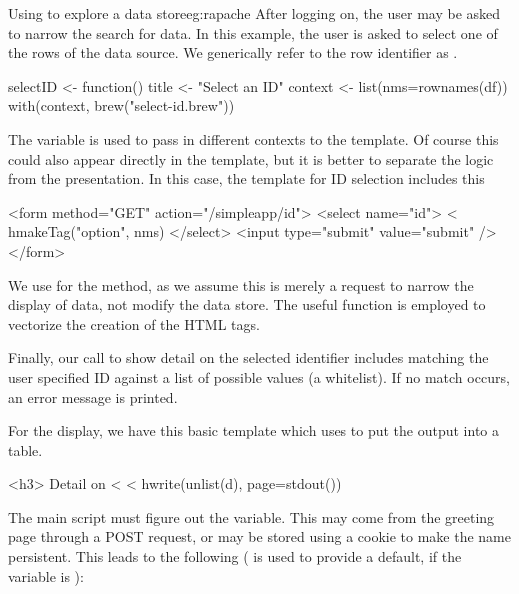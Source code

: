 \begin{example}{Using  to explore a data store}{eg:rapache}
After logging on, the user may be asked to narrow the search for
data. In this example, the user is asked to select one of the rows of
the data source. We generically refer to the row identifier as
. 
\begin{Schunk}
\begin{Sinput}
 selectID <- function() {
   title <- "Select an ID"
   context <- list(nms=rownames(df))   
   with(context, brew("select-id.brew"))
 }
\end{Sinput}
\end{Schunk}
The  variable is used to pass in
different contexts to the  template. Of course this could
also appear directly in the template, but it is better to separate the
logic from the presentation. In this case, the template for ID
selection includes this
\begin{HTMLinput}
<form method="GET" action="/simpleapp/id">
<select name="id">
<%
  hmakeTag("option", nms)
</select>
<input type="submit" value="submit" />
</form>
\end{HTMLinput}
We use  for the method, as we assume this is merely a
request to narrow the display of data, not modify the data store. The
useful  function is employed to vectorize the
creation of the HTML  tags.

Finally, our call to show detail on the selected identifier includes
matching the user specified ID against a list of possible values (a
whitelist). If no match occurs, an error message is printed.
\begin{Schunk}
\end{Schunk}
For the display, we have this basic template which uses
 to put the output into a table.
\begin{HTMLinput}
<h3> Detail on <%
<%
  hwrite(unlist(d), page=stdout()) 
\end{HTMLinput}


The main script must figure out the  variable. This
may come from the greeting page through a POST request, or may be
stored using a cookie to make the name persistent. This leads to the
following ( is used to provide a default, if the variable
is ):
\begin{Schunk}
\end{Schunk}


\end{example}
